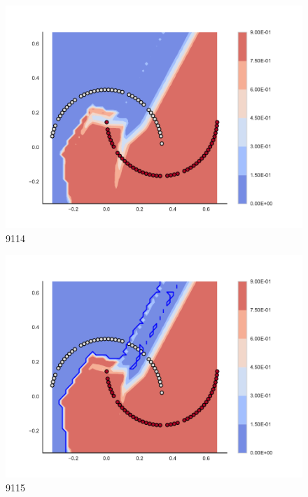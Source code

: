 \begin{subfigure}[b]{0.09\textwidth}
    \includegraphics[clip, trim=2.35cm 1.75cm 4.5cm 0cm,width=\textwidth]{img/convergence/9114.pdf}
    \caption{9114}
    \label{fig:convergence_9114}
\end{subfigure}
%
\begin{subfigure}[b]{0.09\textwidth}
    \includegraphics[clip, trim=2.35cm 1.75cm 4.5cm 0cm,width=\textwidth]{img/convergence/9115.pdf}
    \caption{9115}
    \label{fig:convergence_9115}
\end{subfigure}
%
